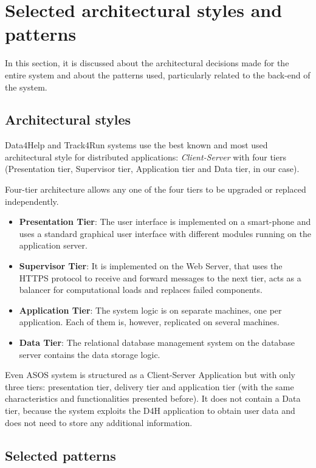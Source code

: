 \section{Selected architectural styles and patterns}
\label{ArchitecturalStylesAndPatterns}

In this section, it is discussed about the architectural decisions made for the entire system and about the patterns used, particularly related to the back-end of the system.

\subsection{Architectural styles}
Data4Help and Track4Run systems use the best known and most used architectural style for distributed applications: \emph{Client-Server} with four tiers (Presentation tier, Supervisor tier, Application tier and Data tier, in our case).

Four-tier architecture allows any one of the four tiers to be upgraded or replaced independently. 
\begin{itemize}
    \item \textbf{Presentation Tier}: The user interface is implemented on a smart-phone and uses a standard graphical user interface with different modules running on the application server.
    \item \textbf{Supervisor Tier}: It is implemented on the Web Server, that uses the HTTPS protocol to receive and forward messages to the next tier, acts as a balancer for computational loads and replaces failed components.
    \item \textbf{Application Tier}: The system logic is on separate machines, one per application. Each of them is, however, replicated on several machines.
    \item \textbf{Data Tier}: The relational database management system on the database server contains the data storage logic.
\end{itemize}  

Even ASOS system is structured as a Client-Server Application but with only three tiers: presentation tier, delivery tier and application tier (with the same characteristics and functionalities presented before). It does not contain a Data tier, because the system exploits the D4H application to obtain user data and does not need to store any additional information.

\subsection{Selected patterns}

